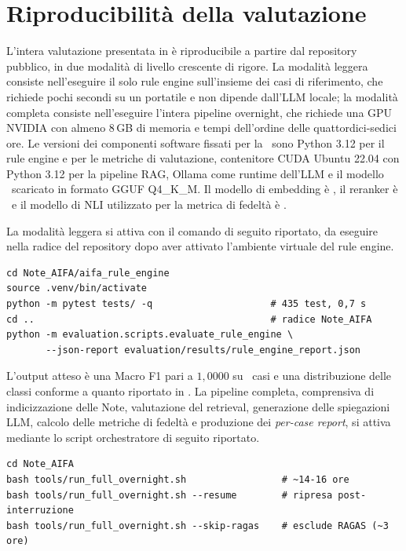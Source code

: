 \chapter{Riproducibilità della valutazione}
\label{app:riproducibilita}

L'intera valutazione presentata in  è riproducibile a partire dal repository pubblico, in due modalità di livello crescente di rigore. La modalità leggera consiste nell'eseguire il solo rule engine sull'insieme dei casi di riferimento, che richiede pochi secondi su un portatile e non dipende dall'LLM locale; la modalità completa consiste nell'eseguire l'intera pipeline overnight, che richiede una GPU NVIDIA con almeno 8\,GB di memoria e tempi dell'ordine delle quattordici-sedici ore. Le versioni dei componenti software fissati per la \cleanroomrun\ sono Python 3.12 per il rule engine e per le metriche di valutazione, contenitore CUDA Ubuntu 22.04 con Python 3.12 per la pipeline RAG, Ollama come runtime dell'LLM e il modello \llmmodel\ scaricato in formato GGUF Q4\_K\_M. Il modello di embedding è \embedmodel, il reranker è \reranker\ e il modello di NLI utilizzato per la metrica di fedeltà è \nlimodel.

La modalità leggera si attiva con il comando di seguito riportato, da eseguire nella radice del repository dopo aver attivato l'ambiente virtuale del rule engine.

\begin{verbatim}
cd Note_AIFA/aifa_rule_engine
source .venv/bin/activate
python -m pytest tests/ -q                     # 435 test, 0,7 s
cd ..                                          # radice Note_AIFA
python -m evaluation.scripts.evaluate_rule_engine \
       --json-report evaluation/results/rule_engine_report.json
\end{verbatim}

L'output atteso è una Macro F1 pari a $1{,}0000$ su \goldn\ casi e una distribuzione delle classi conforme a quanto riportato in . La pipeline completa, comprensiva di indicizzazione delle Note, valutazione del retrieval, generazione delle spiegazioni LLM, calcolo delle metriche di fedeltà e produzione dei \emph{per-case report}, si attiva mediante lo script orchestratore di seguito riportato.

{\footnotesize
\begin{verbatim}
cd Note_AIFA
bash tools/run_full_overnight.sh                 # ~14-16 ore
bash tools/run_full_overnight.sh --resume        # ripresa post-interruzione
bash tools/run_full_overnight.sh --skip-ragas    # esclude RAGAS (~3 ore)
\end{verbatim}
}

